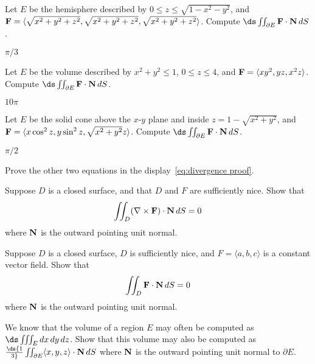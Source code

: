 \begin{enumialphparenastyle}
\begin{ex}
Let $E$ be the hemisphere described by 
$0\le z\le \sqrt{1-x^2-y^2}$, and 
${\bf F}= \langle \sqrt{x^2+y^2+z^2},\sqrt{x^2+y^2+z^2},
\sqrt{x^2+y^2+z^2}\rangle$. Compute
$\ds\iint_{\partial E} {\bf F}\cdot {\bf N}\,dS$.
\begin{sol}
	$\pi/3$
\end{sol}
\end{ex}

\begin{ex}
Let $E$ be the volume described by 
$x^2+y^2\le1$, $0\le z\le4$, and 
${\bf F}= \langle xy^2,yz,x^2z\rangle$. Compute
$\ds\iint_{\partial E} {\bf F}\cdot {\bf N}\,dS$.
\begin{sol}
	$10\pi$
\end{sol}
\end{ex}

\begin{ex}
Let $E$ be the solid cone above the $x$-$y$ plane and
inside $z=1-\sqrt{x^2+y^2}$, and 
${\bf F}= \langle x\cos^2 z,y\sin^2z,\sqrt{x^2+y^2}z\rangle$. Compute
$\ds\iint_{\partial E} {\bf F}\cdot {\bf N}\,dS$.
\begin{sol}
	$\pi/2$
\end{sol}
\end{ex}

\begin{ex}
Prove the other two equations in the 
display~\ref{eq:divergence proof}.
\end{ex}

\begin{ex}
Suppose $D$ is a closed surface, and that $D$ and $F$ are
sufficiently nice. Show that 
$$\iint_{D} (\nabla \times {\bf F}) \cdot {\bf N}\, dS = 0$$
where $\bf N$ is the outward pointing unit normal.
\end{ex}

\begin{ex}
Suppose $D$ is a closed surface, $D$ is sufficiently nice,
and $F=\langle a,b,c\rangle$ is a constant vector field.
Show that 
$$\iint_{D} {\bf F} \cdot {\bf N}\, dS = 0$$
where $\bf N$ is the outward pointing unit normal.
\end{ex}

\begin{ex}
We know that the volume of a region $E$ may often be computed as
$\ds \iiint_{E}dx\,dy\,dz$. Show that this volume may also be computed as
$\ds{1\over3} \iint_{\partial E} \langle x,y,z\rangle \cdot {\bf N}\,dS$
where ${\bf N}$ is the outward pointing unit normal to $\partial E$.
\end{ex}

\end{enumialphparenastyle}